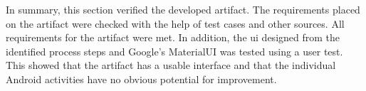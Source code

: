 In summary, this section verified the developed artifact. The requirements placed on the artifact were checked with the help of test cases and other sources. All requirements for the artifact were met. In addition, the \ac{ui} designed from the identified process steps and Google's MaterialUI was tested using a user test. This showed that the artifact has a usable interface and that the individual Android activities have no obvious potential for improvement. 